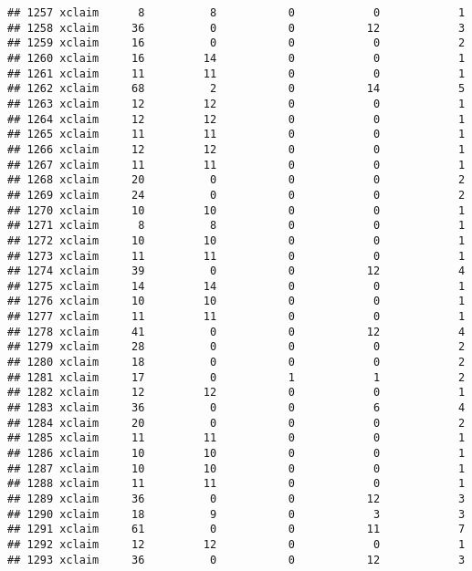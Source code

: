 \documentclass[
]{article}
\begin{document}
\begin{verbatim}
## 1257 xclaim      8          8           0            0            1
## 1258 xclaim     36          0           0           12            3
## 1259 xclaim     16          0           0            0            2
## 1260 xclaim     16         14           0            0            1
## 1261 xclaim     11         11           0            0            1
## 1262 xclaim     68          2           0           14            5
## 1263 xclaim     12         12           0            0            1
## 1264 xclaim     12         12           0            0            1
## 1265 xclaim     11         11           0            0            1
## 1266 xclaim     12         12           0            0            1
## 1267 xclaim     11         11           0            0            1
## 1268 xclaim     20          0           0            0            2
## 1269 xclaim     24          0           0            0            2
## 1270 xclaim     10         10           0            0            1
## 1271 xclaim      8          8           0            0            1
## 1272 xclaim     10         10           0            0            1
## 1273 xclaim     11         11           0            0            1
## 1274 xclaim     39          0           0           12            4
## 1275 xclaim     14         14           0            0            1
## 1276 xclaim     10         10           0            0            1
## 1277 xclaim     11         11           0            0            1
## 1278 xclaim     41          0           0           12            4
## 1279 xclaim     28          0           0            0            2
## 1280 xclaim     18          0           0            0            2
## 1281 xclaim     17          0           1            1            2
## 1282 xclaim     12         12           0            0            1
## 1283 xclaim     36          0           0            6            4
## 1284 xclaim     20          0           0            0            2
## 1285 xclaim     11         11           0            0            1
## 1286 xclaim     10         10           0            0            1
## 1287 xclaim     10         10           0            0            1
## 1288 xclaim     11         11           0            0            1
## 1289 xclaim     36          0           0           12            3
## 1290 xclaim     18          9           0            3            3
## 1291 xclaim     61          0           0           11            7
## 1292 xclaim     12         12           0            0            1
## 1293 xclaim     36          0           0           12            3

\end{verbatim}
\end{document}
